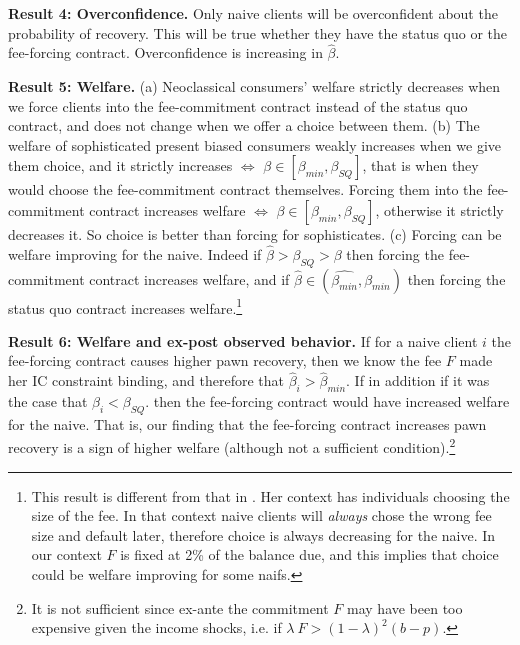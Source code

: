 \documentclass[oneside,11pt]{article}
\begin{document}
\vspace{.1in}
\noindent \textbf{Result 4: Overconfidence.} Only naive clients will be overconfident about the probability of recovery. This will be true whether they have the status quo or the fee-forcing contract. Overconfidence is increasing in $\hat{\beta}$.

\vspace{.1in}
\noindent \textbf{Result 5: Welfare.} (a) Neoclassical consumers' welfare strictly decreases when we force clients into the fee-commitment contract instead of the status quo contract, and does not change when we offer a choice between them. (b) The welfare of sophisticated present biased consumers weakly increases when we give them choice, and it strictly increases  $\iff$  $\beta \in [\beta_{min},\beta_{SQ}]$, that is when they would choose the fee-commitment contract themselves. Forcing them into the fee-commitment contract increases welfare $\iff$  $\beta \in [\beta_{min},\beta_{SQ}]$, otherwise it strictly decreases it. So choice is better than forcing for sophisticates. (c) Forcing can be welfare improving for the naive. Indeed if $\hat{\beta}>\beta_{SQ}>\beta$ then forcing the fee-commitment contract increases welfare, and if $\hat{\beta} \in (\widehat{\beta_{min}},\beta_{min})$ then forcing the status quo contract increases welfare.\footnote{This result is different from that in \cite{John}. Her context has individuals choosing the size of the fee. In that context naive clients will \textit{always} chose the wrong fee size and default later, therefore choice is always decreasing for the naive. In our context $F$ is fixed at 2\% of the balance due, and this implies that choice could be welfare improving for some naifs.}

\vspace{.1in}
\noindent \textbf{Result 6: Welfare and ex-post observed behavior.} If for a naive client $i$ the fee-forcing contract causes higher pawn recovery, then we know the fee $F$ made her IC constraint binding, and therefore that $\hat{\beta}_i>\widehat{\beta}_{min}$. If in addition if it was the case that $\beta_i<\beta_{SQ}$. %
then the fee-forcing contract would have increased welfare for the naive. That is, our finding that the fee-forcing contract increases pawn recovery is a sign of higher welfare (although not a sufficient condition).\footnote{It is not sufficient since ex-ante the commitment $F$ may have been too expensive given the income shocks, i.e. if $\lambda \: F>(1-\lambda)^2(b-p)$.}
\end{document}
